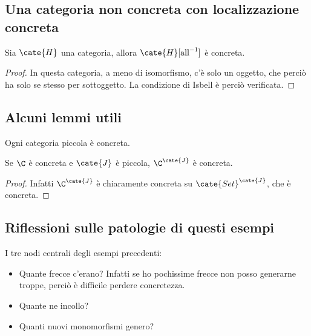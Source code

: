 \documentclass[10pt,a4paper]{amsart}
\begin{document}
\subsection{Una categoria non concreta con localizzazione concreta}

\begin{lemma} Sia $\cate{H}$ una categoria, allora $\cate{H}[\text{all}^{-1}]$ è concreta.
\begin{proof}
In questa categoria, a meno di isomorfismo, c'è solo un oggetto, che perciò ha solo se stesso per sottoggetto. La condizione di Isbell è perciò verificata.
\end{proof}
\end{lemma}


\subsection{Alcuni lemmi utili}
\begin{lemma}
Ogni categoria piccola è concreta.
\end{lemma}
\begin{lemma}
Se $\C$ è concreta e $\cate{J}$ è piccola, $\C^\cate{J}$ è concreta.
\begin{proof}
Infatti $\C^\cate{J}$ è chiaramente concreta su $\cate{Set}^{\cate{J}}$, che è concreta.
\end{proof}
\end{lemma}
\subsection{Riflessioni sulle patologie di questi esempi}

I tre nodi centrali degli esempi precedenti:
\begin{itemize}
\item Quante frecce c'erano? Infatti se ho pochissime frecce non posso generarne troppe, perciò è difficile perdere concretezza.
\item Quante ne incollo?
\item Quanti nuovi monomorfismi genero?
\end{itemize}
\end{document}
